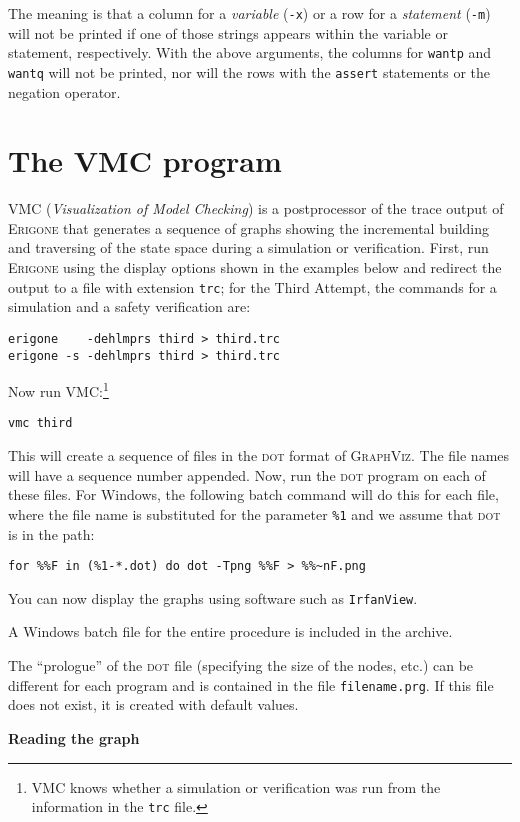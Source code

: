 \documentclass[11pt]{article}
\newcommand*{\prg}{\textsc{Erigone}}
\newcommand*{\vmc}{\textsc{VMC}}
\newcommand*{\dt}{\textsc{dot}}
\newcommand*{\p}[1]{\texttt{#1}}
\begin{document}
The meaning is that a column for a \emph{variable} (\p{-x}) or a row for
a \emph{statement} (\p{-m}) will not be printed if one of those strings
appears within the variable or statement, respectively. With the above
arguments, the columns for \p{wantp} and \p{wantq} will not be printed,
nor will the rows with the \p{assert} statements or the negation
operator.


\section{The \vmc{} program}\label{s.vmc}

\vmc{} (\textit{Visualization of Model Checking}) is a postprocessor of
the trace output of \prg{} that generates a sequence of graphs showing
the incremental building and traversing of the state space during a
simulation or verification. First, run \prg{} using
the display options shown in the examples below and
redirect the output to a file with extension \p{trc}; for the Third
Attempt, the commands for a simulation and a safety verification are:
\begin{verbatim}
erigone    -dehlmprs third > third.trc
erigone -s -dehlmprs third > third.trc
\end{verbatim}
Now run \vmc{}:\footnote{\vmc{} knows whether a simulation or
verification was run from the information in the \p{trc} file.} 
\begin{verbatim}
vmc third
\end{verbatim}
This will create a sequence of files in the \dt{} format of
\textsc{GraphViz}. The file names will have a sequence number appended.
Now, run the \dt{} program on each of these files. For Windows, the
following batch command will do this for each file, where the file name
is substituted for the parameter \verb+%1+ and we assume that \dt{} is
in the path:
\begin{verbatim}
for %%F in (%1-*.dot) do dot -Tpng %%F > %%~nF.png
\end{verbatim}
You can now display the graphs using software such as \p{IrfanView}.

A Windows batch file for the entire procedure is included in the archive.

The ``prologue'' of the \dt{} file (specifying the size of the nodes,
etc.) can be different for each program and is contained in the file
\p{filename.prg}. If this file does not exist, it is created with
default values.

\medskip

\textbf{Reading the graph}
\end{document}
